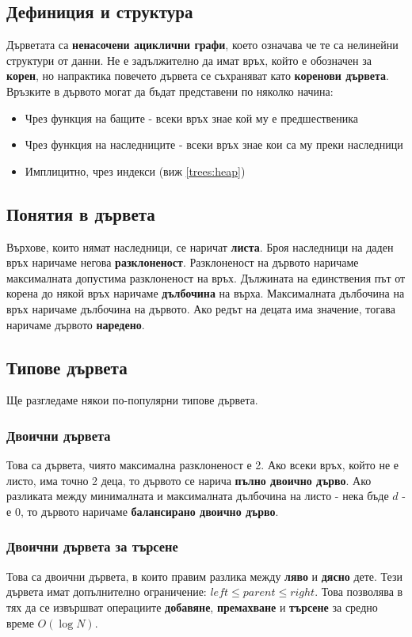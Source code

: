 \documentclass[fleqn,12pt]{article}
\begin{document}
\subsection{Дефиниция и структура}
Дърветата са \textbf{ненасочени ациклични графи}, което означава че те са нелинейни структури от данни. Не е задължително да имат връх, който е обозначен за \textbf{корен}, но
напрактика повечето дървета се съхраняват като \textbf{коренови дървета}. Връзките в дървото могат да бъдат представени по няколко начина:
\begin{itemize}
    \item Чрез функция на бащите - всеки връх знае кой му е предшественика
    \item Чрез функция на наследниците - всеки връх знае кои са му преки наследници
    \item Имплицитно, чрез индекси (виж \ref{trees:heap})
\end{itemize}

\subsection{Понятия в дървета}
Върхове, които нямат наследници, се наричат \textbf{листа}. Броя наследници на даден връх наричаме негова \textbf{разклоненост}.
Разклоненост на дървото наричаме максималната допустима разклоненост на връх. Дължината на единствения път от корена до някой връх
наричаме \textbf{дълбочина} на върха. Максималната дълбочина на връх наричаме дълбочина на дървото. Ако редът на децата има значение,
тогава наричаме дървото \textbf{наредено}.

\subsection{Типове дървета}
Ще разгледаме някои по-популярни типове дървета.

\subsubsection{Двоични дървета}
Това са дървета, чиято максимална разклоненост е 2. Ако всеки връх, който не е листо, има точно 2 деца,
то дървото се нарича \textbf{пълно двоично дърво}. Ако разликата между минималната и максималната дълбочина на листо - нека бъде $d$ - е 0, 
то дървото наричаме \textbf{балансирано двоично дърво}.

\subsubsection{Двоични дървета за търсене}
Това са двоични дървета, в които правим разлика между \textbf{ляво} и \textbf{дясно} дете.
Тези дървета имат допълнително ограничение: $left \leq parent \leq right$. 
Това позволява в тях да се извършват операциите \textbf{добавяне}, \textbf{премахване} и \textbf{търсене} за средно време $O(\log N)$.
\end{document}
